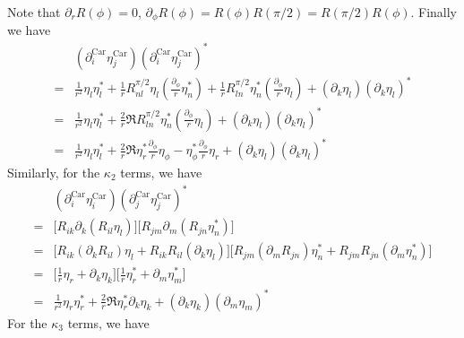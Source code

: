 \documentclass[aps,prl,preprint]{revtex4-2}
\begin{document}
Note that $\partial_r R(\phi)=0$, $\partial_\phi R(\phi)=R(\phi)R(\pi/2)=R(\pi/2)R(\phi)$.
Finally we have
\begin{align}
      & (\partial_i^{\text{Car}}\eta_j^{\text{Car}})(\partial_i^{\text{Car}}\eta_j^{\text{Car}})^* \\
    = & \frac{1}{r^2}\eta_l\eta_l^*
    +\frac{1}{r}R^{\pi/2}_{nl}\eta_l\left(\frac{\partial_\phi}{r}\eta_n^*\right)
    +\frac{1}{r}R^{\pi/2}_{ln}\eta_n^*\left(\frac{\partial_\phi}{r}\eta_l\right)
    + (\partial_k\eta_l)(\partial_k \eta_l)^*                                                      \\
    = & \frac{1}{r^2}\eta_l\eta_l^*
    +\frac{2}{r}\Re{R^{\pi/2}_{ln}\eta_n^*\left(\frac{\partial_\phi}{r}\eta_l\right)}
    +(\partial_k\eta_l)(\partial_k \eta_l)^*                                                       \\
    = & \frac{1}{r^2}\eta_l\eta_l^*
    +\frac{2}{r}\Re{\eta_r^*\frac{\partial_\phi}{r}\eta_\phi - \eta_\phi^*\frac{\partial_\phi}{r}\eta_r}
    +(\partial_k\eta_l)(\partial_k \eta_l)^*
\end{align}
Similarly, for the $\kappa_2$ terms, we have
\begin{align}
      & (\partial_i^{\text{Car}}\eta_i^{\text{Car}})(\partial_j^{\text{Car}}\eta_j^{\text{Car}})^*           \\
    = & \bigg[R_{ik}\partial_k(R_{il}\eta_l)\bigg]\bigg[R_{jm}\partial_m(R_{jn}\eta_n^*)\bigg]               \\
    = & \bigg[R_{ik}(\partial_k R_{il})\eta_l + R_{ik}R_{il}(\partial_k\eta_l)\bigg]
    \bigg[R_{jm}(\partial_m R_{jn})\eta_n^* + R_{jm}R_{jn}(\partial_m\eta_n^*)\bigg]                         \\
    = & \bigg[\frac{1}{r}\eta_r + \partial_k\eta_k\bigg]\bigg[\frac{1}{r}\eta_r^* + \partial_m\eta_m^*\bigg] \\
    = & \frac{1}{r^2}\eta_r\eta_r^* + \frac{2}{r}\Re{\eta_r^*\partial_k\eta_k}
    +(\partial_k\eta_k)(\partial_m \eta_m)^*
\end{align}
For the $\kappa_3$ terms, we have
\end{document}
